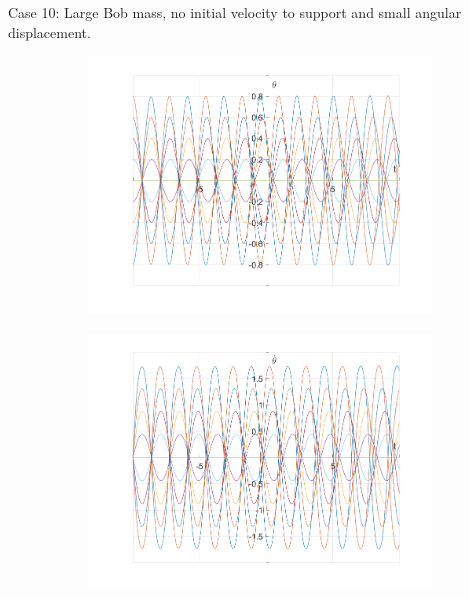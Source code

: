 \documentclass{article}
\begin{document}
	Case 10:
	Large Bob mass, no initial velocity to support and small angular displacement.	
	\begin{figure}[h!]
		\centering
		\begin{subfigure}[b]{0.48\linewidth}
			\includegraphics[width=\linewidth]{./SmallOscillations/S10/F1.png}
		\end{subfigure}
		\begin{subfigure}[b]{0.48\linewidth}
			\includegraphics[width=\linewidth]{./SmallOscillations/S10/F2.png}
		\end{subfigure}
	\end{figure}
	
\end{document}
